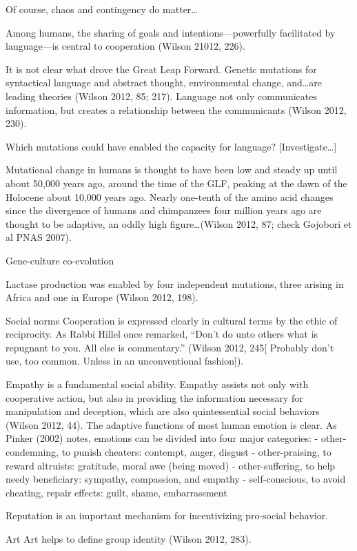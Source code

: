 \documentclass{tufte-book} %
\begin{document}
Of course, chaos and contingency do matter… 

Among humans, the sharing of goals and intentions—powerfully facilitated by language—is central to cooperation (Wilson 21012, 226). 

It is not clear what drove the Great Leap Forward. Genetic mutations for syntactical language and abstract thought, environmental change, and…are leading theories (Wilson 2012, 85; 217). Language not only communicates information, but creates a relationship between the communicants (Wilson 2012, 230).

Which mutations could have enabled the capacity for language? [Investigate…]

Mutational change in humans is thought to have been low and steady up until about 50,000 years ago, around the time of the GLF, peaking at the dawn of the Holocene about 10,000 years ago. Nearly one-tenth of the amino acid changes since the divergence of humans and chimpanzees four million years ago are thought to be adaptive, an oddly high figure…(Wilson 2012, 87; check Gojobori et al PNAS 2007).



Gene-culture co-evolution

Lactase production was enabled by four independent mutations, three arising in Africa and one in Europe (Wilson 2012, 198).


Social norms
Cooperation is expressed clearly in cultural terms by the ethic of reciprocity. As Rabbi Hillel once remarked, “Don’t do unto others what is repugnant to you. All else is commentary.” (Wilson 2012, 245[ Probably don’t use, too common. Unless in an unconventional fashion]).

Empathy is a fundamental social ability. Empathy assists not only with cooperative action, but also in providing the information necessary for manipulation and deception, which are also quintessential social behaviors (Wilson 2012, 44). The adaptive functions of most human emotion is clear. As Pinker (2002) notes, emotions can be divided into four major categories:
- other-condemning, to punish cheaters: contempt, anger, disgust 
- other-praising, to reward altruists: gratitude, moral awe (being moved) 
- other-suffering, to help needy beneficiary: sympathy, compassion, and empathy 
- self-conscious, to avoid cheating, repair effects: guilt, shame, embarrassment 

Reputation is an important mechanism for incentivizing pro-social behavior. 

Art
Art helps to define group identity (Wilson 2012, 283).
\end{document}

